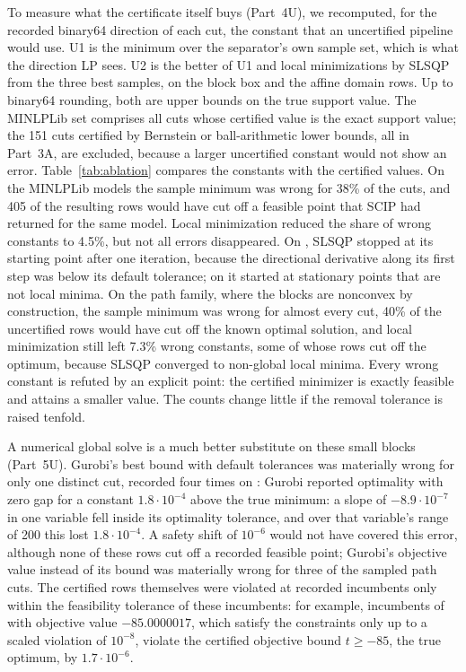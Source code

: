 To measure what the certificate itself buys (Part~4U), we recomputed, for the
recorded binary64 direction of each cut, the constant that an uncertified
pipeline would use. U1 is the minimum over the separator's own sample set,
which is what the direction LP sees. U2 is the better of U1 and local
minimizations by SLSQP \citep{Kraft1988} from the three best samples, on the
block box and the affine domain rows. Up to binary64 rounding, both are upper
bounds on the true support value. The MINLPLib set comprises all cuts whose
certified value is the exact support value; the 151 cuts certified by
Bernstein or ball-arithmetic lower bounds, all in Part~3A, are excluded, because
a larger uncertified constant would not show an error. Table~\ref{tab:ablation}
compares the constants with the certified values. On the MINLPLib models the
sample minimum was wrong for 38\% of the cuts, and 405 of the resulting rows
would have cut off a feasible point that SCIP had returned for the same model.
Local minimization reduced the share of wrong constants to 4.5\%, but not all
errors disappeared. On , SLSQP stopped at its starting point after
one iteration, because the directional derivative along its first step was
below its default tolerance; on  it started at
stationary points that are not local minima. On the path family, where the
blocks are nonconvex by construction, the sample minimum was wrong for almost
every cut, 40\% of the uncertified rows would have cut off the known optimal
solution, and local minimization still left 7.3\% wrong constants, some of
whose rows cut off the optimum, because SLSQP converged to non-global local
minima. Every wrong constant is refuted by an explicit point: the certified
minimizer is exactly feasible and attains a smaller value. The counts change
little if the removal tolerance is raised tenfold.

A numerical global solve is a much better substitute on these small blocks
(Part~5U). Gurobi's best bound with default tolerances was materially wrong for
only one distinct cut, recorded four times on : Gurobi reported
optimality with zero gap for a constant $1.8\cdot10^{-4}$ above the true
minimum: a slope of $-8.9\cdot10^{-7}$ in one variable fell inside its
optimality tolerance, and over that variable's range of 200 this lost
$1.8\cdot10^{-4}$. A safety shift of $10^{-6}$ would not
have covered this error, although none of these rows cut off a recorded
feasible point; Gurobi's objective value instead of its bound was materially
wrong for three of the sampled path cuts. The certified rows themselves were
violated at recorded incumbents only within the feasibility tolerance of these
incumbents: for example, incumbents of  with objective value
$-85.0000017$, which satisfy the constraints only up to a scaled violation of
$10^{-8}$, violate the certified objective bound $t\ge-85$, the true optimum, by
$1.7\cdot10^{-6}$.
